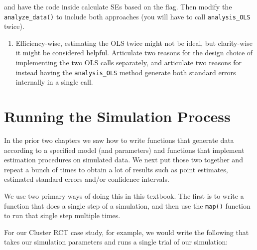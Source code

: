 \documentclass[
]{book}
\providecommand{\tightlist}{%
  \setlength{\itemsep}{0pt}\setlength{\parskip}{0pt}}
\begin{document}
and have the code inside calculate SEs based on the flag. Then modify the \texttt{analyze\_data()} to include both approaches (you will have to call \texttt{analysis\_OLS} twice).

\begin{enumerate}
\def\labelenumi{\arabic{enumi}.}
\setcounter{enumi}{3}
\tightlist
\item
  Efficiency-wise, estimating the OLS twice might not be ideal, but clarity-wise it might be considered helpful. Articulate two reasons for the design choice of implementing the two OLS calls separately, and articulate two reasons for instead having the \texttt{analysis\_OLS} method generate both standard errors internally in a single call.
\end{enumerate}

\chapter{Running the Simulation Process}\label{running-the-simulation-process}

In the prior two chapters we saw how to write functions that generate data according to a specified model (and parameters) and functions that implement estimation procedures on simulated data.
We next put those two together and repeat a bunch of times to obtain a lot of results such as point estimates, estimated standard errors and/or confidence intervals.

We use two primary ways of doing this in this textbook.
The first is to write a function that does a single step of a simulation, and then use the \texttt{map()} function to run that single step multiple times.

For our Cluster RCT case study, for example, we would write the following that takes our simulation parameters and runs a single trial of our simulation:
\end{document}

